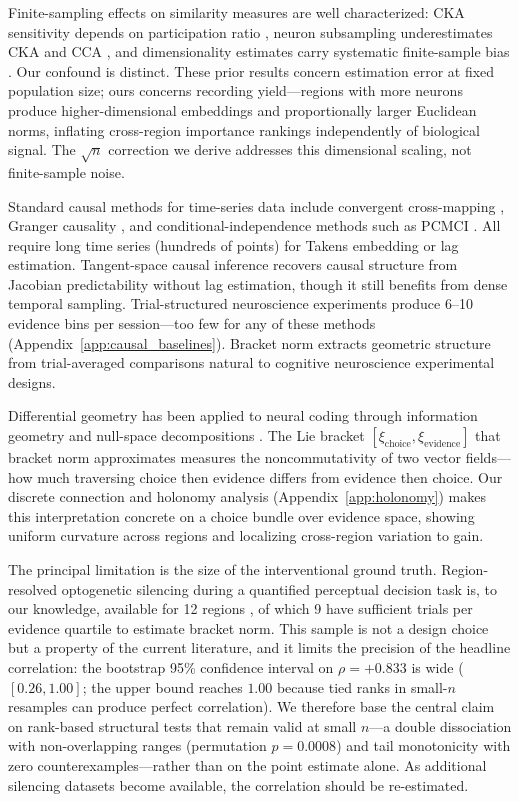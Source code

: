 \documentclass[9pt,lineno]{elife}
\begin{document}
Finite-sampling effects on similarity measures are well characterized: CKA sensitivity depends on participation ratio \citep{harvey2024representational}, neuron subsampling underestimates CKA and CCA \citep{murphy2024biased}, and dimensionality estimates carry systematic finite-sample bias \citep{chung2026dimensionality, spectral2025neurips}. Our confound is distinct. These prior results concern estimation error at fixed population size; ours concerns recording yield---regions with more neurons produce higher-dimensional embeddings and proportionally larger Euclidean norms, inflating cross-region importance rankings independently of biological signal. The $\sqrt{n}$ correction we derive addresses this dimensional scaling, not finite-sample noise.

Standard causal methods for time-series data include convergent cross-mapping \citep{sugihara2012detecting}, Granger causality \citep{granger1969investigating}, and conditional-independence methods such as PCMCI \citep{runge2019detecting}. All require long time series (hundreds of points) for Takens embedding or lag estimation. Tangent-space causal inference \citep{butler2024tsci} recovers causal structure from Jacobian predictability without lag estimation, though it still benefits from dense temporal sampling. Trial-structured neuroscience experiments produce 6--10 evidence bins per session---too few for any of these methods (Appendix~\ref{app:causal_baselines}). Bracket norm extracts geometric structure from trial-averaged comparisons natural to cognitive neuroscience experimental designs.

Differential geometry has been applied to neural coding through information geometry \citep{amari2016information} and null-space decompositions \citep{kaufman2014cortical}. The Lie bracket $[\xi_{\text{choice}}, \xi_{\text{evidence}}]$ that bracket norm approximates measures the noncommutativity of two vector fields---how much traversing choice then evidence differs from evidence then choice. Our discrete connection and holonomy analysis (Appendix~\ref{app:holonomy}) makes this interpretation concrete on a choice bundle over evidence space, showing uniform curvature across regions and localizing cross-region variation to gain.

The principal limitation is the size of the interventional ground truth. Region-resolved optogenetic silencing during a quantified perceptual decision task is, to our knowledge, available for 12 regions \citep{steinmetz2019distributed, zatkahaas2021}, of which 9 have sufficient trials per evidence quartile to estimate bracket norm. This sample is not a design choice but a property of the current literature, and it limits the precision of the headline correlation: the bootstrap 95\% confidence interval on $\rho = +0.833$ is wide ($[0.26, 1.00]$; the upper bound reaches $1.00$ because tied ranks in small-$n$ resamples can produce perfect correlation). We therefore base the central claim on rank-based structural tests that remain valid at small $n$---a double dissociation with non-overlapping ranges (permutation $p = 0.0008$) and tail monotonicity with zero counterexamples---rather than on the point estimate alone. As additional silencing datasets become available, the correlation should be re-estimated.
\end{document}
